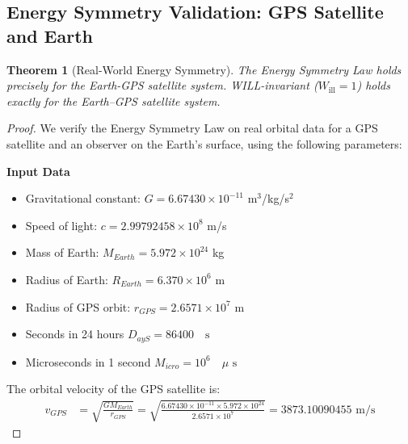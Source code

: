 \documentclass[12pt, a4paper]{article}
\newtheorem{theorem}{Theorem}[section]
\begin{document}
\subsection{Energy Symmetry Validation: GPS Satellite and Earth}

\begin{theorem}[Real-World Energy Symmetry]
The Energy Symmetry Law holds precisely for the Earth-GPS satellite system.
 WILL-invariant ($W_{\text{ill}} = 1$) holds exactly for the Earth–GPS satellite system.
\end{theorem}

\begin{proof}
We verify the Energy Symmetry Law on real orbital data for a GPS satellite and an observer on the Earth's surface, using the following parameters:

\textbf{ Input Data}
\begin{itemize}
\item Gravitational constant: $G = 6.67430 \times 10^{-11}$ m$^3$/kg/s$^2$
\item Speed of light: $c = 2.99792458 \times 10^8$ m/s
\item Mass of Earth: $M_{Earth} = 5.972 \times 10^{24}$ kg
\item Radius of Earth: $R_{Earth} = 6.370 \times 10^6$ m
\item Radius of GPS orbit: $r_{GPS} = 2.6571 \times 10^7$ m
\item Seconds in 24 hours $D_{ayS} =86400 \quad  \text{s}$
\item Microseconds in 1 second $M_{icro}=10^6  \quad \mu\text{ s}$
\end{itemize}

The orbital velocity of the GPS satellite is:
\begin{align}
v_{GPS} &= \sqrt{\frac{GM_{Earth}}{r_{GPS}}} 
= \sqrt{\frac{6.67430 \times 10^{-11} \times 5.972 \times 10^{24}}{2.6571 \times 10^7}} 
= 3873.10090455 \text{ m/s}
\end{align}


\end{proof}
\end{document}
